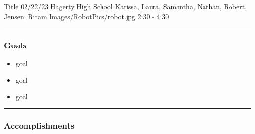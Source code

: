 \insertmeeting 
	{Title} 
	{02/22/23} 
	{Hagerty High School}
	{Karissa, Laura,  Samantha, Nathan, Robert, Jensen, Ritam}
	{Images/RobotPics/robot.jpg}
	{2:30 - 4:30}
	
\noindent\hfil\rule{\textwidth}{.4pt}\hfil
\subsubsection*{Goals}
\begin{itemize}
    \item goal
    \item goal
    \item goal

\end{itemize} 

\noindent\hfil\rule{\textwidth}{.4pt}\hfil

\subsubsection*{Accomplishments}



